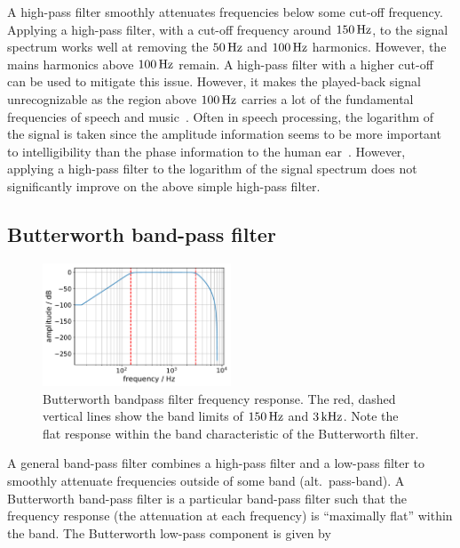 \documentclass[aps,pra,superscriptaddress,reprint]{revtex4-2}
\begin{document}
A high-pass filter smoothly attenuates frequencies below some cut-off frequency. 
Applying a high-pass filter, with a cut-off frequency around $150\,{\rm Hz}$, to the signal spectrum works well at removing the $50\,{\rm Hz}$ and $100\,{\rm Hz}$ harmonics. However, the mains harmonics above $100\,{\rm Hz}$ remain. A high-pass filter with a higher cut-off can be used to mitigate this issue. However, it makes the played-back signal unrecognizable as the region above $100\,{\rm Hz}$ carries a lot of the fundamental frequencies of speech and music~\cite{speech_intelligibility}.
Often in speech processing, the logarithm of the signal is taken since the amplitude information seems to be more important to intelligibility than the phase information to the human ear~\cite{SubjectiveComparison}. However, applying a high-pass filter to the logarithm of the signal spectrum does not significantly improve on the above simple high-pass filter.



\subsection{Butterworth band-pass filter}

\begin{figure}
	\includegraphics[width=0.5\textwidth]{figures/butterworth_150_3000.pdf}
	\caption{
Butterworth bandpass filter frequency response. 
The red, dashed vertical lines show the band limits of $150\,{\rm Hz}$ and $3\,{\rm kHz}$. Note the flat response within the band characteristic of the Butterworth filter.}
	\label{fig:butterworth}
\end{figure}

A general band-pass filter combines a high-pass filter and a low-pass filter to smoothly attenuate frequencies outside of some band (alt.\ pass-band). A Butterworth band-pass filter is a particular band-pass filter such that the frequency response (the attenuation at each frequency) is ``maximally flat'' within the band. The Butterworth low-pass component is given by %
\end{document}
